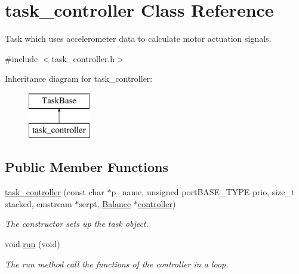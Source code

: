 \hypertarget{classtask__controller}{}\section{task\+\_\+controller Class Reference}
\label{classtask__controller}


Task which uses accelerometer data to calculate motor actuation signals.  




{\ttfamily \#include $<$task\+\_\+controller.\+h$>$}

Inheritance diagram for task\+\_\+controller\+:\begin{figure}[H]
\begin{center}
\leavevmode
\includegraphics[height=2.000000cm]{classtask__controller}
\end{center}
\end{figure}
\subsection*{Public Member Functions}
\begin{DoxyCompactItemize}
\item 
\hyperlink{classtask__controller_a35efdd65ff9e1c4b883003ed664c0662}{task\+\_\+controller} (const char $\ast$p\+\_\+name, unsigned port\+B\+A\+S\+E\+\_\+\+T\+Y\+PE prio, size\+\_\+t stacked, emstream $\ast$serpt, \hyperlink{classBalance}{Balance} $\ast$\hyperlink{classtask__controller_a52518117258982efd9fbf567d597aa86}{controller})
\begin{DoxyCompactList}\small\item\em The constructor sets up the task object. \end{DoxyCompactList}\item 
void \hyperlink{classtask__controller_a06d4bf08d08ae59c4693028ec009bb84}{run} (void)
\begin{DoxyCompactList}\small\item\em The run method call the functions of the controller in a loop. \end{DoxyCompactList}\end{DoxyCompactItemize}
